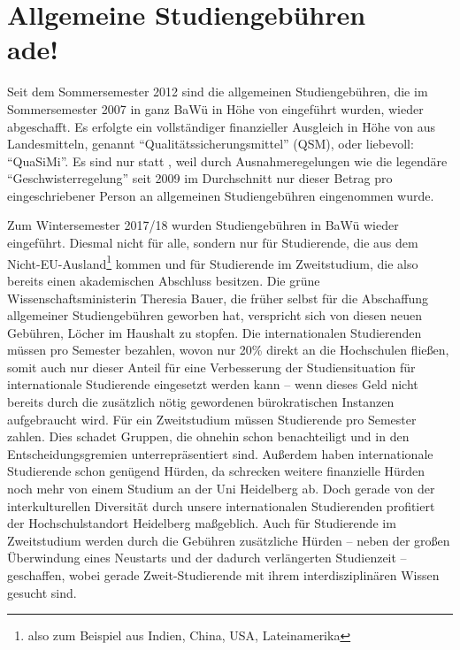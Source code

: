 \section[Allgemeine Studiengebühren ade]{Allgemeine Studiengebühren \\ade!}


Seit dem Sommersemester 2012 sind die allgemeinen Studiengebühren, die im Sommersemester 2007 in ganz BaWü in Höhe von  eingeführt wurden, wieder abgeschafft. Es erfolgte ein vollständiger finanzieller Ausgleich in Höhe von  aus Landesmitteln, genannt “Qualitätssicherungsmittel” (QSM), oder liebevoll: “QuaSiMi”. Es sind nur  statt , weil durch Ausnahmeregelungen wie die legendäre “Geschwisterregelung” seit 2009 im Durchschnitt nur dieser Betrag pro eingeschriebener Person an allgemeinen Studiengebühren eingenommen wurde.

Zum Wintersemester 2017/18 wurden Studiengebühren in BaWü wieder eingeführt. Diesmal nicht für alle, sondern nur für Studierende, die aus dem Nicht-EU-Ausland\footnote{also zum Beispiel aus Indien, China, USA, Lateinamerika} kommen und für Studierende im Zweitstudium, die also bereits einen akademischen Abschluss besitzen. Die grüne Wissenschaftsministerin Theresia Bauer, die früher selbst für die Abschaffung allgemeiner Studiengebühren geworben hat, verspricht sich von diesen neuen Gebühren, Löcher im Haushalt zu stopfen. Die internationalen Studierenden müssen  pro Semester bezahlen, wovon nur 20\% direkt an die Hochschulen fließen, somit auch nur dieser Anteil für eine Verbesserung der Studiensituation für internationale Studierende eingesetzt werden kann -- wenn dieses Geld nicht bereits durch die zusätzlich nötig gewordenen bürokratischen Instanzen aufgebraucht wird. Für ein Zweitstudium müssen Studierende  pro Semester zahlen. Dies schadet Gruppen, die ohnehin schon benachteiligt und in den Entscheidungsgremien unterrepräsentiert sind. Außerdem haben internationale Studierende schon genügend Hürden, da schrecken weitere finanzielle Hürden noch mehr von einem Studium an der Uni Heidelberg ab. Doch gerade von der interkulturellen Diversität durch unsere internationalen Studierenden profitiert der Hochschulstandort Heidelberg maßgeblich. Auch für Studierende im Zweitstudium werden durch die Gebühren zusätzliche Hürden -- neben der großen Überwindung eines Neustarts und der dadurch verlängerten Studienzeit -- geschaffen, wobei gerade Zweit-Studierende mit ihrem interdisziplinären Wissen gesucht sind.


